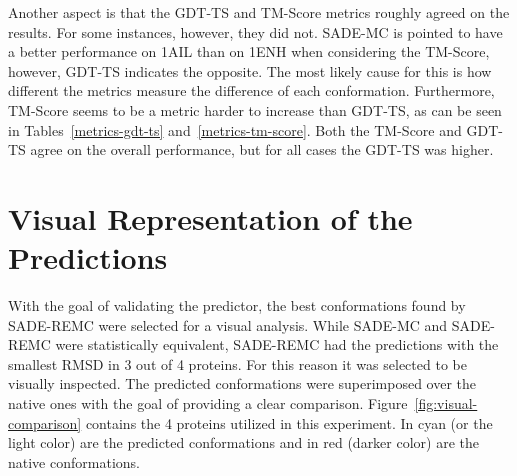 Another aspect is that the GDT-TS and TM-Score metrics roughly agreed
on the results. For some instances, however, they did not. SADE-MC is
pointed to have a better performance on 1AIL than on 1ENH when
considering the TM-Score, however, GDT-TS indicates the opposite.
The most likely cause for this is how different the metrics
measure the difference of each conformation. Furthermore, TM-Score seems to be a metric harder to increase than GDT-TS, as can be seen in Tables~\ref{metrics-gdt-ts} and~\ref{metrics-tm-score}. Both the TM-Score and GDT-TS agree on the overall performance, but for all cases the GDT-TS was higher.

\section{Visual Representation of the Predictions}

With the goal of validating the predictor, the best conformations found by SADE-REMC were selected for a visual analysis. While SADE-MC and SADE-REMC were statistically equivalent, SADE-REMC had the predictions with the smallest \ac{RMSD} in 3 out of 4 proteins. For this reason it was selected to be visually inspected. The predicted conformations were superimposed over the native ones with the goal of providing a clear comparison. Figure~\ref{fig:visual-comparison} contains the 4 proteins utilized in this experiment. In cyan (or the light color) are the predicted conformations and in red (darker color) are the native conformations.


